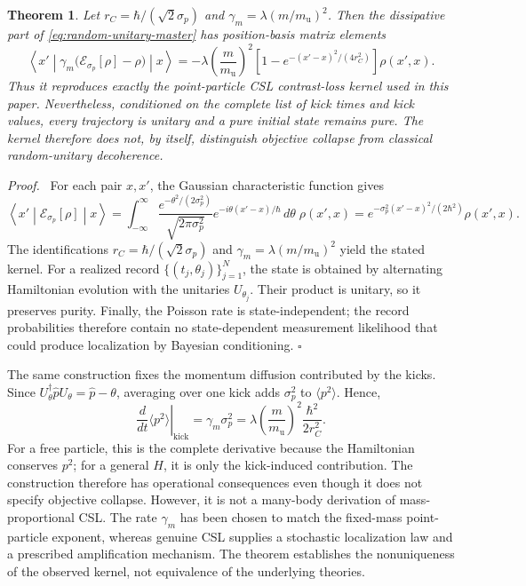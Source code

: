 \documentclass[
  aps,
  prd,
  preprint,
  notitlepage,
  superscriptaddress,
  nofootinbib,
  longbibliography
]{revtex4-2}
\newtheorem{theorem}{Theorem}
\newenvironment{proof}{\par\noindent\textit{Proof.}\ }{\hfill$\square$\par}
\newcommand{\amu}{m_{\mathrm u}}
\begin{document}
\begin{theorem}
Let $r_C=\hbar/(\sqrt{2}\sigma_p)$ and $\gamma_m=\lambda(m/\amu)^2$. Then the dissipative part of \eqref{eq:random-unitary-master} has position-basis matrix elements
\[
\left\langle x'\middle|
\gamma_m\bigl(\mathcal E_{\sigma_p}[\rho]-\rho\bigr)
\middle|x\right\rangle
=-\lambda\left(\frac{m}{\amu}\right)^2
\left[1-e^{-(x'-x)^2/(4r_C^2)}\right]\rho(x',x).
\]
Thus it reproduces exactly the point-particle CSL contrast-loss kernel used in this paper. Nevertheless, conditioned on the complete list of kick times and kick values, every trajectory is unitary and a pure initial state remains pure. The kernel therefore does not, by itself, distinguish objective collapse from classical random-unitary decoherence.
\end{theorem}

\begin{proof}
For each pair $x,x'$, the Gaussian characteristic function gives
\[
\left\langle x'\middle|\mathcal E_{\sigma_p}[\rho]\middle|x\right\rangle
=\int_{-\infty}^{\infty}
\frac{e^{-\theta^2/(2\sigma_p^2)}}{\sqrt{2\pi\sigma_p^2}}
e^{-i\theta(x'-x)/\hbar}\,d\theta\;\rho(x',x)
=e^{-\sigma_p^2(x'-x)^2/(2\hbar^2)}\rho(x',x).
\]
The identifications $r_C=\hbar/(\sqrt{2}\sigma_p)$ and $\gamma_m=\lambda(m/\amu)^2$ yield the stated kernel. For a realized record $\{(t_j,\theta_j)\}_{j=1}^N$, the state is obtained by alternating Hamiltonian evolution with the unitaries $U_{\theta_j}$. Their product is unitary, so it preserves purity. Finally, the Poisson rate is state-independent; the record probabilities therefore contain no state-dependent measurement likelihood that could produce localization by Bayesian conditioning.
\end{proof}

The same construction fixes the momentum diffusion contributed by the kicks. Since $U_\theta^\dagger\hat p U_\theta=\hat p-\theta$, averaging over one kick adds $\sigma_p^2$ to $\langle p^2\rangle$. Hence,
\begin{equation}
\left.\frac{d}{dt}\langle p^2\rangle\right|_{\mathrm{kick}}
=\gamma_m\sigma_p^2
=\lambda\left(\frac{m}{\amu}\right)^2\frac{\hbar^2}{2r_C^2}.
\label{eq:momentum-diffusion}
\end{equation}
For a free particle, this is the complete derivative because the Hamiltonian conserves $p^2$; for a general $H$, it is only the kick-induced contribution. The construction therefore has operational consequences even though it does not specify objective collapse. However, it is not a many-body derivation of mass-proportional CSL. The rate $\gamma_m$ has been chosen to match the fixed-mass point-particle exponent, whereas genuine CSL supplies a stochastic localization law and a prescribed amplification mechanism. The theorem establishes the nonuniqueness of the observed kernel, not equivalence of the underlying theories.
\end{document}
